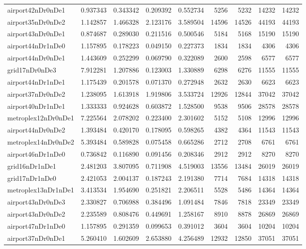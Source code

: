 \begin{longtable}{|l|r|r|r|r|r|r|r|r|}
airport42nDr0nDe1 & 0.937343 & 0.343342 & 0.209392 & 0.552734 & 5256 & 5232 & 14232 & 14232 \\
airport35nDr0nDe2 & 1.142857 & 1.466328 & 2.123176 & 3.589504 & 14596 & 14526 & 44193 & 44193 \\
airport43nDr0nDe1 & 0.874687 & 0.289030 & 0.211516 & 0.500546 & 5184 & 5168 & 15190 & 15190 \\
airport44nDr1nDe0 & 1.157895 & 0.178223 & 0.049150 & 0.227373 & 1834 & 1834 & 4306 & 4306 \\
airport44nDr0nDe1 & 1.443609 & 0.252299 & 0.069790 & 0.322089 & 2600 & 2598 & 6577 & 6577 \\
grid17nDr0nDe3 & 7.912281 & 1.207886 & 0.123003 & 1.330889 & 6298 & 6276 & 11555 & 11555 \\
airport44nDr1nDe1 & 1.175439 & 0.201578 & 0.071370 & 0.272948 & 2632 & 2630 & 6623 & 6623 \\
airport37nDr0nDe2 & 1.238095 & 1.613918 & 1.919806 & 3.533724 & 12926 & 12844 & 37042 & 37042 \\
airport40nDr1nDe1 & 1.333333 & 0.924628 & 0.603872 & 1.528500 & 9538 & 9506 & 28578 & 28578 \\
metroplex12nDr0nDe1 & 7.225564 & 2.078202 & 0.223400 & 2.301602 & 5152 & 5108 & 12996 & 12996 \\
airport44nDr0nDe2 & 1.393484 & 0.420170 & 0.178095 & 0.598265 & 4382 & 4364 & 11543 & 11543 \\
metroplex14nDr0nDe2 & 5.393484 & 0.589828 & 0.075458 & 0.665286 & 2712 & 2708 & 6761 & 6761 \\
airport46nDr1nDe0 & 0.736842 & 0.116890 & 0.091456 & 0.208346 & 2912 & 2912 & 8270 & 8270 \\
grid16nDr1nDe1 & 2.481203 & 3.807095 & 0.711908 & 4.519003 & 13556 & 13484 & 26019 & 26019 \\
grid17nDr1nDe0 & 2.421053 & 2.004137 & 0.187243 & 2.191380 & 7714 & 7684 & 14318 & 14318 \\
metroplex13nDr1nDe1 & 3.413534 & 1.954690 & 0.251821 & 2.206511 & 5528 & 5486 & 14364 & 14364 \\
airport43nDr0nDe3 & 2.330827 & 0.706988 & 0.384496 & 1.091484 & 7846 & 7818 & 23349 & 23349 \\
airport43nDr0nDe2 & 2.235589 & 0.808476 & 0.449691 & 1.258167 & 8910 & 8878 & 26869 & 26869 \\
airport47nDr1nDe0 & 1.157895 & 0.291359 & 0.099653 & 0.391012 & 3604 & 3604 & 10204 & 10204 \\
airport37nDr0nDe1 & 5.260410 & 1.602609 & 2.653880 & 4.256489 & 12932 & 12850 & 37051 & 37051 \\

\end{longtable}
